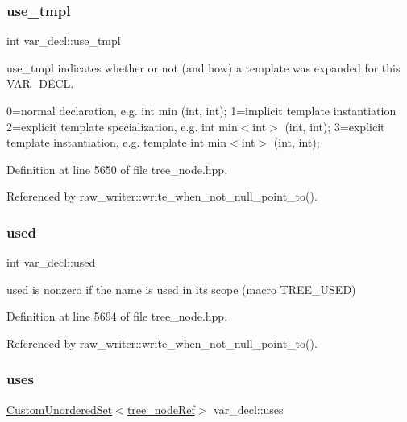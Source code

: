 \subsubsection{\texorpdfstring{use\+\_\+tmpl}{use\_tmpl}}
{\footnotesize\ttfamily int var\+\_\+decl\+::use\+\_\+tmpl}



use\+\_\+tmpl indicates whether or not (and how) a template was expanded for this V\+A\+R\+\_\+\+D\+E\+CL. 

0=normal declaration, e.\+g. int min (int, int); 1=implicit template instantiation 2=explicit template specialization, e.\+g. int min$<$int$>$ (int, int); 3=explicit template instantiation, e.\+g. template int min$<$int$>$ (int, int); 

Definition at line 5650 of file tree\+\_\+node.\+hpp.



Referenced by raw\+\_\+writer\+::write\+\_\+when\+\_\+not\+\_\+null\+\_\+point\+\_\+to().

\mbox{\label{structvar__decl_ac9259d77c70867cde093fad6bc07b48c}} 
\subsubsection{\texorpdfstring{used}{used}}
{\footnotesize\ttfamily int var\+\_\+decl\+::used}



used is nonzero if the name is used in its scope (macro T\+R\+E\+E\+\_\+\+U\+S\+ED) 



Definition at line 5694 of file tree\+\_\+node.\+hpp.



Referenced by raw\+\_\+writer\+::write\+\_\+when\+\_\+not\+\_\+null\+\_\+point\+\_\+to().

\mbox{\label{structvar__decl_ad7f95855a9455bc23f36841fb4d83daa}} 
\subsubsection{\texorpdfstring{uses}{uses}}
{\footnotesize\ttfamily \hyperlink{classCustomUnorderedSet}{Custom\+Unordered\+Set}$<$\hyperlink{tree__node_8hpp_a6ee377554d1c4871ad66a337eaa67fd5}{tree\+\_\+node\+Ref}$>$ var\+\_\+decl\+::uses}



